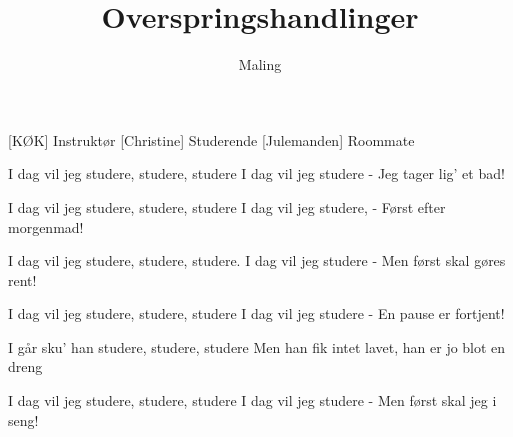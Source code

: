 \documentclass[a4paper,11pt]{article}
\title{Overspringshandlinger}
\author{Maling}
\begin{document}
\maketitle

\begin{roles}
[KØK] Instruktør
[Christine] Studerende
[Julemanden] Roommate
\end{roles}

\begin{song}

 I dag vil jeg studere, studere, studere 
I dag vil jeg studere  - Jeg tager lig’ et bad! 

 I dag vil jeg studere, studere, studere 
I dag vil jeg studere,  - Først efter morgenmad!

 I dag vil jeg studere, studere, studere. 
I dag vil jeg studere  - Men først skal gøres rent!

  I dag vil jeg studere, studere, studere 
I dag vil jeg studere  - En pause er fortjent!


 I går sku’ han studere, studere, studere 
Men han fik intet lavet, han er jo blot en dreng

 I dag vil jeg studere, studere, studere 
I dag vil jeg studere  - Men først skal jeg i seng!

\end{song}
\end{document}
